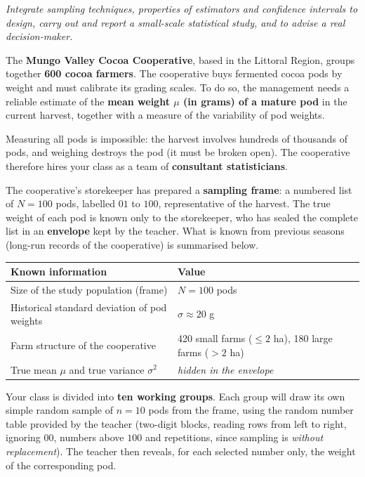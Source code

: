 \documentclass[11pt]{article}
\newcounter{popsec}
\newcounter{popsub}
\newcommand{\courssub}[1]{%
  \stepcounter{popsub}%
  \par\vspace{9pt}\noindent{\popxbold\fontsize{11.5}{13}\selectfont\color{popink}{\color{poporange}\thepopsec.\thepopsub}\hspace{6pt}#1}\par\nopagebreak\vspace{4pt}
}
\begin{document}
\begin{aretenir}
\emph{Integrate sampling techniques, properties of estimators and confidence intervals to design, carry out and report a small-scale statistical study, and to advise a real decision-maker.}
\end{aretenir}

\courssub{Situation}

The \textbf{Mungo Valley Cocoa Cooperative}, based in the Littoral Region, groups together \textbf{600 cocoa farmers}. The cooperative buys fermented cocoa pods by weight and must calibrate its grading scales. To do so, the management needs a reliable estimate of the \textbf{mean weight $\mu$ (in grams) of a mature pod} in the current harvest, together with a measure of the variability of pod weights.

Measuring all pods is impossible: the harvest involves hundreds of thousands of pods, and weighing destroys the pod (it must be broken open). The cooperative therefore hires your class as a team of \textbf{consultant statisticians}.

The cooperative's storekeeper has prepared a \textbf{sampling frame}: a numbered list of $N = 100$ pods, labelled $01$ to $100$, representative of the harvest. The true weight of each pod is known only to the storekeeper, who has sealed the complete list in an \textbf{envelope} kept by the teacher. What is known from previous seasons (long-run records of the cooperative) is summarised below.

\begin{center}
\begin{tabularx}{\linewidth}{|l|X|}
\hline
\rowcolor{popblueL} \textbf{Known information} & \textbf{Value} \\
\hline
Size of the study population (frame) & $N = 100$ pods \\
\hline
Historical standard deviation of pod weights & $\sigma \approx 20$ g \\
\hline
Farm structure of the cooperative & 420 small farms ($\le 2$ ha), 180 large farms ($> 2$ ha) \\
\hline
True mean $\mu$ and true variance $\sigma^2$ & \emph{hidden in the envelope} \\
\hline
\end{tabularx}
\end{center}

Your class is divided into \textbf{ten working groups}. Each group will draw its own simple random sample of $n = 10$ pods from the frame, using the random number table provided by the teacher (two-digit blocks, reading rows from left to right, ignoring $00$, numbers above $100$ and repetitions, since sampling is \emph{without replacement}). The teacher then reveals, for each selected number only, the weight of the corresponding pod.
\end{document}
